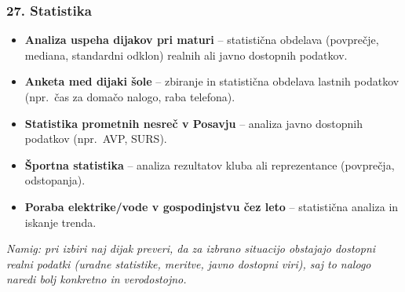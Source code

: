 \documentclass[11pt,a4paper]{article}
\begin{document}
\subsubsection*{27. Statistika}
\begin{itemize}
  \item \textbf{Analiza uspeha dijakov pri maturi} -- statistična obdelava (povprečje, mediana, standardni odklon) realnih ali javno dostopnih podatkov.
  \item \textbf{Anketa med dijaki šole} -- zbiranje in statistična obdelava lastnih podatkov (npr.\ čas za domačo nalogo, raba telefona).
  \item \textbf{Statistika prometnih nesreč v Posavju} -- analiza javno dostopnih podatkov (npr.\ AVP, SURS).
  \item \textbf{Športna statistika} -- analiza rezultatov kluba ali reprezentance (povprečja, odstopanja).
  \item \textbf{Poraba elektrike/vode v gospodinjstvu čez leto} -- statistična analiza in iskanje trenda.
\end{itemize}

\bigskip
\noindent\textit{Namig: pri izbiri naj dijak preveri, da za izbrano situacijo obstajajo dostopni realni podatki (uradne statistike, meritve, javno dostopni viri), saj to nalogo naredi bolj konkretno in verodostojno.}
\end{document}

